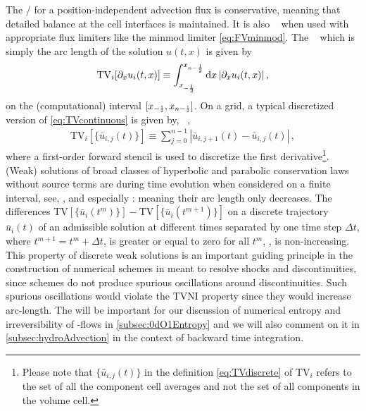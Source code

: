 The \kt{}/\knpScheme{} for a position-independent advection flux is conservative, meaning that detailed balance at the cell interfaces is maintained.
It is also \tvni{}~\cite{HARTEN1983357,LeVeque:1992,LeVeque:2002} when used with appropriate flux limiters like the minmod limiter \eqref{eq:FVminmod}.
The \tv{}~\cite{HARTEN1983357} \dash{} which is simply the arc length \dash{} of the solution $u ( t, x )$ is given by
\begin{align}
	\mathrm{TV}_i [ \partial_x u_i ( t, x ) ] \equiv \int_{x_{-\frac{1}{2}}}^{x_{n-\frac{1}{2}}} \dif x \, | \partial_x u_i ( t, x ) | \, ,	\label{eq:TVcontinuous}
\end{align}
on the (computational) interval $[ x_{-\ttfrac{1}{2}},x_{n-\ttfrac{1}{2}} ]$.
On a \fv{} grid, a typical discretized version of \cref{eq:TVcontinuous} is given by, \cf{}\ ,
\begin{align}
	\mathrm{TV}_i [ \{ \bar{u}_{i,j} ( t ) \} ] \equiv \sum_{j = 0}^{n-1} | \bar{u}_{i,j+1} ( t ) - \bar{u}_{i,j} ( t ) | \, ,	\label{eq:TVdiscrete}
\end{align}
where a first-order forward stencil is used to discretize the first derivative\footnote{
	Please note that $\{ \bar{u}_{i,j} ( t ) \}$ in the definition \cref{eq:TVdiscrete} of $\mathrm{TV}_i$ refers to the set of all the  component cell averages and not the set of all components in the  volume cell.
}. 
(Weak) solutions of broad classes of hyperbolic and parabolic conservation laws \dash{} without source terms \dash{} are \tvni{} during time evolution when considered on a finite interval, see, \eg{},  and especially : meaning their arc length only decreases.
The differences $\mathrm{TV} [ \{ \bar{u}_i ( t^{m } ) \} ] - \mathrm{TV} [ \{ \bar{u}_i ( t^{m+1} ) \} ]$ on a discrete trajectory $\bar{u}_i ( t )$ of an admissible solution at different times separated by one time step $\Delta t$, where $t^{m+1} = t^m + \Delta t$, is greater or equal to zero for all $t^m$, \ie{}, \tv{} is non-increasing.
This \tvni{} property of discrete weak solutions is an important guiding principle in the construction of numerical schemes in \cfd{} meant to resolve shocks and discontinuities, since \tvni{} schemes do not produce spurious oscillations around discontinuities.
Such spurious oscillations would violate the TVNI property since they would increase arc-length.
The \tv{} will be important for our discussion of numerical entropy and irreversibility of \rg{}-flows in \cref{subsec:0dO1Entropy} and we will also comment on it in \cref{subsec:hydroAdvection} in the context of backward time integration.
	
